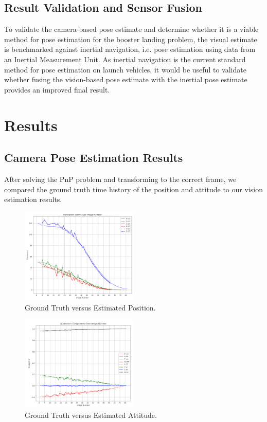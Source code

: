 \documentclass[conference]{IEEEtran}
\begin{document}
\subsection{Result Validation and Sensor Fusion}
To validate the camera-based pose estimate and determine whether it is a viable method for pose estimation for the booster landing problem, the visual estimate is benchmarked against inertial navigation, i.e. pose estimation using data from an Inertial Measurement Unit. 
As inertial navigation is the current standard method for pose estimation on launch vehicles, it would be useful to validate whether fusing the vision-based pose estimate with the inertial pose estimate provides an improved final result. 


\section{Results}

\subsection{Camera Pose Estimation Results}
After solving the PnP problem and transforming to the correct frame, we compared the ground truth time history of the position and attitude to our vision estimation results.

\begin{figure}[ht!] 
    \centerline{\includegraphics[width=0.5\textwidth]{translation_comp.png}}
    \caption{Ground Truth versus Estimated Position.}
    \label{fig:trans_comp}
\end{figure}

\begin{figure}[ht!] 
    \centerline{\includegraphics[width=0.5\textwidth]{quaternion_comp.png}}
    \caption{Ground Truth versus Estimated Attitude.}
    \label{fig:quat_comp}
\end{figure}
\end{document}
